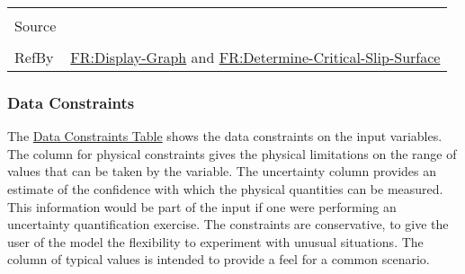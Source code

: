 \documentclass[12pt]{article}
\begin{document}
\begin{minipage}{\textwidth}
\begin{tabular}{>{\raggedright}p{}>{\raggedright\arraybackslash}p{}}
\\ \midrule \\
Source & \cite{li2010}
         
\\ \midrule \\
RefBy & \hyperref[displayGraph]{FR:Display-Graph} and \hyperref[determineCritSlip]{FR:Determine-Critical-Slip-Surface}
        
\\ \bottomrule
\end{tabular}
\end{minipage}

\subsubsection{Data Constraints}
\label{Sec:DataConstraints}
The \hyperref[Table:InDataConstraints]{Data Constraints Table} shows the data constraints on the input variables. The column for physical constraints gives the physical limitations on the range of values that can be taken by the variable. The uncertainty column provides an estimate of the confidence with which the physical quantities can be measured. This information would be part of the input if one were performing an uncertainty quantification exercise. The constraints are conservative, to give the user of the model the flexibility to experiment with unusual situations. The column of typical values is intended to provide a feel for a common scenario.
\end{document}
